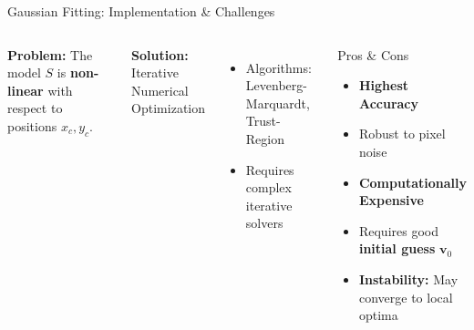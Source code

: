 \begin{frame}{Gaussian Fitting: Implementation \& Challenges}
    \begin{columns}
        \textbf{Problem:} The model $S$ is \textbf{non-linear} with respect to positions $x_c, y_c$.
        
        \vspace{0.2cm}
        \textbf{Solution:} Iterative Numerical Optimization
        \begin{itemize}
            \item Algorithms: Levenberg-Marquardt, Trust-Region
            \item Requires complex iterative solvers
        \end{itemize}
        
        \vspace{0.2cm}
        \begin{block}{Pros \& Cons}
            \begin{itemize}
                \item[\textcolor{green!60!black}{\checkmark}] \textbf{Highest Accuracy}
                \item[\textcolor{green!60!black}{\checkmark}] Robust to pixel noise
                \item[\textcolor{red}{\texttimes}] \textbf{Computationally Expensive}
                \item[\textcolor{red}{\texttimes}] Requires good \textbf{initial guess} $\mathbf{v}_0$
                \item[\textcolor{red}{\texttimes}] \textbf{Instability:} May converge to local optima
            \end{itemize}
        \end{block}
        
        \centering
\end{columns}
\end{frame}
